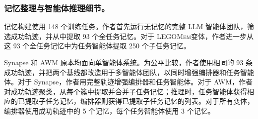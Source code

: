 \documentclass[10pt,twocolumn]{article}
\newcommand{\legomem}{\textsc{LEGOMem}}
\begin{document}
\subsubsection{记忆整理与智能体推理细节。}
记忆构建使用 148 个训练任务。作者首先运行无记忆的完整 LLM 智能体团队，筛选成功轨迹，并从中提取 93 个全任务记忆。对于 \legomem 变体，作者进一步从这 93 个全任务记忆中为任务智能体提取 250 个子任务记忆。

Synapse 和 AWM 原本均面向单智能体系统。为公平比较，作者使用相同的 93 条成功轨迹，并把两个基线都改造用于多智能体团队，以同时增强编排器和任务智能体。对于 Synapse，作者用完整轨迹增强编排器和任务智能体。对于 AWM，作者对成功轨迹聚类，从每个簇中提取并合并子任务记忆；推理时，任务智能体获得相应的已提取子任务记忆，编排器则获得已提取子任务记忆的列表。对于所有变体，编排器使用成功轨迹中的 5 个记忆，每个任务智能体使用 3 个记忆。
\end{document}
